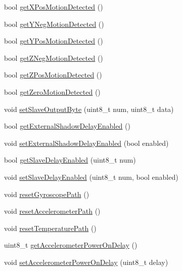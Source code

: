 \begin{DoxyCompactItemize}
bool \mbox{\hyperlink{class_m_p_u6050_a410af58f5ff5f74e4ef8d61495908226}{get\+X\+Pos\+Motion\+Detected}} ()
\item 
bool \mbox{\hyperlink{class_m_p_u6050_a6c45be7b4aa9081c83ee0f4081bf0827}{get\+Y\+Neg\+Motion\+Detected}} ()
\item 
bool \mbox{\hyperlink{class_m_p_u6050_ad959ec84b9fe9f7e416b7af252f37abc}{get\+Y\+Pos\+Motion\+Detected}} ()
\item 
bool \mbox{\hyperlink{class_m_p_u6050_a3601b732eb15644212b8f29cf396e142}{get\+Z\+Neg\+Motion\+Detected}} ()
\item 
bool \mbox{\hyperlink{class_m_p_u6050_a33c766cd415fc5780417b1ed76717875}{get\+Z\+Pos\+Motion\+Detected}} ()
\item 
bool \mbox{\hyperlink{class_m_p_u6050_a384765351b5c4bd2b6efec9ed71ad1b7}{get\+Zero\+Motion\+Detected}} ()
\item 
void \mbox{\hyperlink{class_m_p_u6050_a34a1def575f6abcd464afe954de8a461}{set\+Slave\+Output\+Byte}} (uint8\+\_\+t num, uint8\+\_\+t data)
\item 
bool \mbox{\hyperlink{class_m_p_u6050_a0e5cb13838298609b5260fd1558f8c92}{get\+External\+Shadow\+Delay\+Enabled}} ()
\item 
void \mbox{\hyperlink{class_m_p_u6050_a9160193d883871037c6535a9d3e02ee2}{set\+External\+Shadow\+Delay\+Enabled}} (bool enabled)
\item 
bool \mbox{\hyperlink{class_m_p_u6050_ae84fd795630f9ab5e8d6b19a616a11ce}{get\+Slave\+Delay\+Enabled}} (uint8\+\_\+t num)
\item 
void \mbox{\hyperlink{class_m_p_u6050_a471929d7cf9049357c345633d22412a9}{set\+Slave\+Delay\+Enabled}} (uint8\+\_\+t num, bool enabled)
\item 
void \mbox{\hyperlink{class_m_p_u6050_af1599c0d70f07fd3e28683d571842c22}{reset\+Gyroscope\+Path}} ()
\item 
void \mbox{\hyperlink{class_m_p_u6050_a99ee74708c12f32e48ef5ec69ac9f4a9}{reset\+Accelerometer\+Path}} ()
\item 
void \mbox{\hyperlink{class_m_p_u6050_a559c2d091d36a4e0489bc639916ddbb6}{reset\+Temperature\+Path}} ()
\item 
uint8\+\_\+t \mbox{\hyperlink{class_m_p_u6050_aae903df2accc687423f9cd0a78f9cd32}{get\+Accelerometer\+Power\+On\+Delay}} ()
\item 
void \mbox{\hyperlink{class_m_p_u6050_a2bbde7653d2d2d37e16e515599f3b08b}{set\+Accelerometer\+Power\+On\+Delay}} (uint8\+\_\+t delay)
\item 

\end{DoxyCompactItemize}

